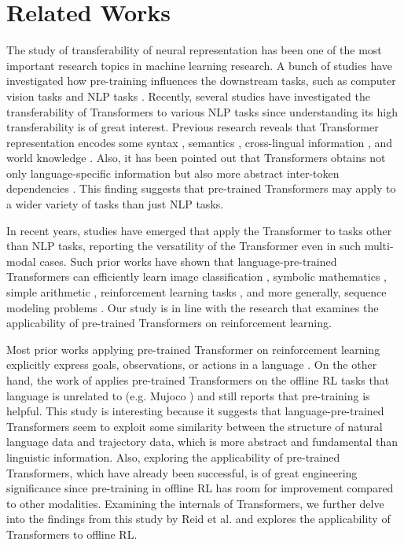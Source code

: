 \section{Related Works}
\label{section:related-works}

The study of transferability of neural representation has been one of the most important research topics in machine learning research. A bunch of studies have investigated how pre-training influences the downstream tasks, such as computer vision tasks \cite{yosinski2014transferable,djolonga2021robustness,ding2021analyzing,orhand2021quantification} and NLP tasks \cite{mou2016transferable,liu-etal-2019-linguistic,rogers2020primer}. Recently, several studies have investigated the transferability of Transformers to various NLP tasks since understanding its high transferability is of great interest. Previous research reveals that Transformer representation encodes some syntax \cite{tenney2018what}, semantics \cite{ettinger2020bert}, cross-lingual information \cite{artetxe-etal-2020-cross}, and world knowledge \cite{petroni-etal-2019-language}.
Also, it has been pointed out that Transformers obtains not only language-specific information but also more abstract inter-token dependencies \cite{ri2022pretraining,chiang2021transferability,chi-etal-2020-finding}. This finding suggests that pre-trained Transformers may apply to a wider variety of tasks than just NLP tasks.

In recent years, studies have emerged that apply the Transformer to tasks other than NLP tasks, reporting the versatility of the Transformer even in such multi-modal cases. Such prior works have shown that language-pre-trained Transformers can efficiently learn image classification \cite{lu2021pretrained}, symbolic mathematics \cite{noorbakhsh2021pretrained}, simple arithmetic \cite{brown2020language}, reinforcement learning tasks \cite{li2022pre,huang2022language,tam2022semantic,reid2022can}, and more generally, sequence modeling problems \cite{lu2021pretrained}. Our study is in line with the research that examines the applicability of pre-trained Transformers on reinforcement learning.

Most prior works applying pre-trained Transformer on reinforcement learning explicitly express goals, observations, or actions in a language \cite{yao2020keep,huang2022language,tam2022semantic}. On the other hand, the work of \cite{reid2022can} applies pre-trained Transformers on the offline RL tasks that language is unrelated to (e.g. Mujoco \cite{todorov2012mujoco}) and still reports that pre-training is helpful. This study is interesting because it suggests that language-pre-trained Transformers seem to exploit some similarity between the structure of natural language data and trajectory data, which is more abstract and fundamental than linguistic information. 
Also, exploring the applicability of pre-trained Transformers, which have already been successful, is of great engineering significance since pre-training in offline RL has room for improvement compared to other modalities. Examining the internals of Transformers, we further delve into the findings from this study by Reid et al. \cite{reid2022can} and explores the applicability of Transformers to offline RL.
